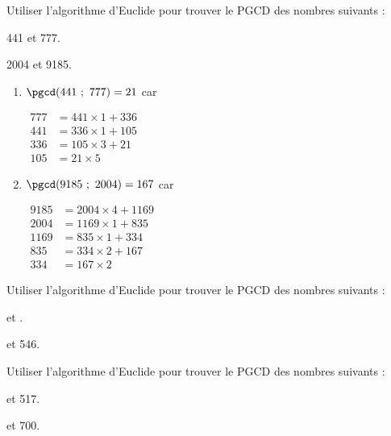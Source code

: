 \begin{colonne*exercice}

\begin{exercice*}
  \label{exo-alg_euclide}
  Utiliser l’algorithme d’Euclide pour trouver le PGCD des nombres
  suivants :
\begin{colenumerate}{2}
\item 441 et 777. 
\item 2004 et 9185.
\end{colenumerate}
\end{exercice*}
\begin{corrige}
  \begin{enumerate}
\item $\pgcd(441\ ;\ 777)=21$ car

$\begin{aligned}
777&=441\times1+336\\
441&=336\times1+105\\
336&=105\times3+21\\
105&=21\times5\end{aligned}$\medskip

\item $\pgcd(9185\ ;\ 2004)=167$ car

$\begin{aligned}
9185&=2004\times4+1169\\
2004&=1169\times1+835\\
1169&=835\times1+334\\
835&=334\times2+167\\
334&=167\times2\end{aligned}$
\end{enumerate}
\end{corrige}

\begin{exercice}
  Utiliser l’algorithme d’Euclide pour trouver le PGCD des nombres
  suivants :
\begin{colenumerate}{2}
\item {} et . 
\item {} et 546.
\end{colenumerate}
\end{exercice}

\begin{exercice}
  Utiliser l’algorithme d’Euclide pour trouver le PGCD des nombres
  suivants :
\begin{colenumerate}{2}
\item {} et 517. 
\item {} et 700.
\end{colenumerate}
\end{exercice}


\end{colonne*exercice}
